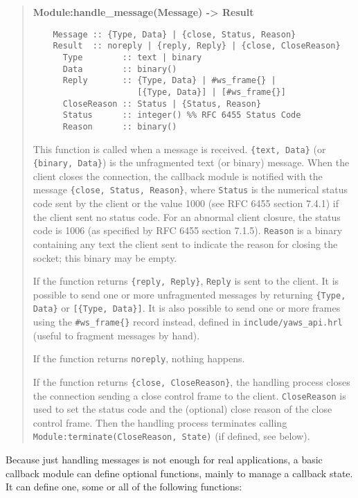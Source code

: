 \documentclass[11pt,oneside,english]{book}
\begin{document}
\begin{quote}
  \textbf{Module:handle\_message(Message) -> Result}
\begin{verbatim}
    Message :: {Type, Data} | {close, Status, Reason}
    Result  :: noreply | {reply, Reply} | {close, CloseReason}
      Type        :: text | binary
      Data        :: binary()
      Reply       :: {Type, Data} | #ws_frame{} |
                     [{Type, Data}] | [#ws_frame{}]
      CloseReason :: Status | {Status, Reason}
      Status      :: integer() %% RFC 6455 Status Code
      Reason      :: binary()
\end{verbatim}

  This function is called when a message is received. \verb+{text, Data}+ (or
  \verb+{binary, Data}+) is the unfragmented text (or binary) message. When the
  client closes the connection, the callback module is notified with the message
  \verb+{close, Status, Reason}+, where \verb+Status+ is the numerical status
  code sent by the client or the value 1000 (see RFC 6455 section 7.4.1) if the
  client sent no status code. For an abnormal client closure, the status code is
  1006 (as specified by RFC 6455 section 7.1.5). \verb+Reason+ is a binary
  containing any text the client sent to indicate the reason for closing the
  socket; this binary may be empty.

  If the function returns \verb+{reply, Reply}+, \verb+Reply+ is sent to
  the client. It is possible to send one or more unfragmented messages by
  returning \verb+{Type, Data}+ or \verb+[{Type, Data}]+. It is also
  possible to send one or more frames using the \verb+#ws_frame{}+ record
  instead, defined in \verb+include/yaws_api.hrl+ (useful to fragment
  messages by hand).

  If the function returns \verb+noreply+, nothing happens.

  If the function returns \verb+{close, CloseReason}+, the handling process
  closes the connection sending a close control frame to the
  client. \verb+CloseReason+ is used to set the status code and the (optional)
  close reason of the close control frame. Then the handling process terminates
  calling \verb+Module:terminate(CloseReason, State)+ (if defined, see below).
\end{quote}


Because just handling messages is not enough for real applications, a basic
callback module can define optional functions, mainly to manage a callback
state. It can define one, some or all of the following functions:
\end{document}
